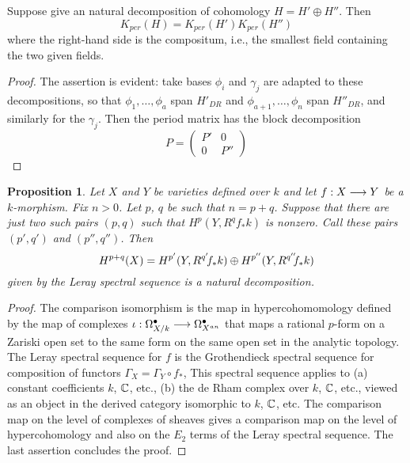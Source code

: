 \documentclass[11pt]{amsart}
\newtheorem{proposition}{Proposition}
\begin{document}
\begin{lemma}  Suppose give an natural decomposition of cohomology
$H = H' \oplus H''$.  Then
\[
    K_{per}(H) = K_{per}(H')K_{per}(H'')
\]
where the right-hand side is the compositum, i.e., the smallest field containing the two
given fields.
\end{lemma}

\begin{proof}
The assertion is evident: take bases $\phi_i$ and $\gamma_j$ are adapted to these
decompositions, so that $\phi_1, \ldots, \phi_a$ span $H'_{DR}$
and $\phi_{a+1}, \ldots, \phi_n$ span $H''_{DR}$, and similarly
for the $\gamma_j$.  Then the period matrix has the block decomposition
\[
   P = \left(
          \begin{array}{cc}
          P' & 0 \\
          0 & P''
          \end{array}
         \right)
\]
\end{proof}






\begin{proposition} Let $X$ and $Y$ be varieties defined over $k$ and let $f: X \longrightarrow Y$ be a $k$-morphism.  Fix $n > 0$.
Let $p$, $q$ be such that $n = p + q$.  Suppose that there are just two such pairs $(p,q)$  such that $H^p(Y, R^qf_* k)$ is nonzero.
Call these pairs $(p', q')$ and $(p'', q'')$.  Then
\[
   H^{p+q}(X) =  H^{p'}(Y, R^{q'} {\kern-2pt} f_*k) \oplus  H^{p''}(Y, R^{q''} {\kern-3pt} f_*k)
\]
given by the Leray spectral sequence is a natural decomposition.
\end{proposition}

\begin{proof}
The comparison isomorphism is the map in hypercohomomology defined by the map of complexes $\iota: \Omega_{X/k}^\bullet  \longrightarrow \Omega_{X^{an}}^\bullet $
that maps a rational $p$-form on a Zariski open set to the same form on the same open set in the analytic topology.
The Leray spectral sequence for $f$ is the Grothendieck spectral sequence for composition of functors $\Gamma_X = \Gamma_Y \circ f_*$,
This spectral sequence applies to (a) constant coefficients $k$, ${\mathbb C}$, etc., (b) the de Rham complex over $k$, ${\mathbb C}$, etc., viewed as an object in the derived category isomorphic to  $k$, ${\mathbb C}$, etc.  The comparison map on the level of complexes of sheaves gives a comparison map on the level of hypercohomology and also on the $E_2$ terms of the Leray spectral sequence.  The last assertion concludes the proof.
\end{proof}
\end{document}
